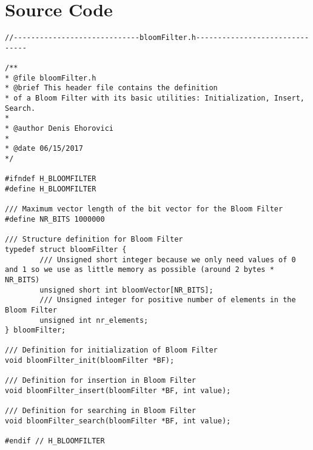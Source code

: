 \documentclass[14pt]{article}
\begin{document}
\section*{Source Code}
\begin{lstlisting}
//-----------------------------bloomFilter.h-------------------------------

/**
* @file bloomFilter.h
* @brief This header file contains the definition
* of a Bloom Filter with its basic utilities: Initialization, Insert, Search.
*
* @author Denis Ehorovici
*
* @date 06/15/2017
*/

#ifndef H_BLOOMFILTER
#define H_BLOOMFILTER

/// Maximum vector length of the bit vector for the Bloom Filter
#define NR_BITS 1000000

/// Structure definition for Bloom Filter
typedef struct bloomFilter {
        /// Unsigned short integer because we only need values of 0 and 1 so we use as little memory as possible (around 2 bytes * NR_BITS)
        unsigned short int bloomVector[NR_BITS];
        /// Unsigned integer for positive number of elements in the Bloom Filter
        unsigned int nr_elements;
} bloomFilter;

/// Definition for initialization of Bloom Filter
void bloomFilter_init(bloomFilter *BF);

/// Definition for insertion in Bloom Filter
void bloomFilter_insert(bloomFilter *BF, int value);

/// Definition for searching in Bloom Filter
void bloomFilter_search(bloomFilter *BF, int value);

#endif // H_BLOOMFILTER

\end{lstlisting}
\end{document}
